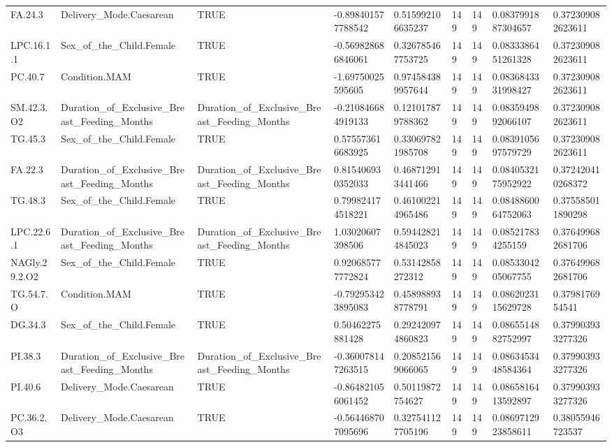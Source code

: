 \begin{longtable}{lllllllll}
FA.24.3 & Delivery\_Mode.Caesarean & TRUE & -0.898401577788542 & 0.515992106635237 & 149 & 149 & 0.0837991887304657 & 0.372309082623611 \\
LPC.16.1.1 & Sex\_of\_the\_Child.Female & TRUE & -0.569828686846061 & 0.326785467753725 & 149 & 149 & 0.0833386451261328 & 0.372309082623611 \\
PC.40.7 & Condition.MAM & TRUE & -1.69750025595605 & 0.974584389957644 & 149 & 149 & 0.0836843331998427 & 0.372309082623611 \\
SM.42.3.O2 & Duration\_of\_Exclusive\_Breast\_Feeding\_Months & Duration\_of\_Exclusive\_Breast\_Feeding\_Months & -0.210846684919133 & 0.121017879788362 & 149 & 149 & 0.0835949892066107 & 0.372309082623611 \\
TG.45.3 & Sex\_of\_the\_Child.Female & TRUE & 0.575573616683925 & 0.330697821985708 & 149 & 149 & 0.0839105697579729 & 0.372309082623611 \\
FA.22.3 & Duration\_of\_Exclusive\_Breast\_Feeding\_Months & Duration\_of\_Exclusive\_Breast\_Feeding\_Months & 0.815406930352033 & 0.468712913441466 & 149 & 149 & 0.0840532175952922 & 0.372420410268372 \\
TG.48.3 & Sex\_of\_the\_Child.Female & TRUE & 0.799824174518221 & 0.461002214965486 & 149 & 149 & 0.0848860064752063 & 0.375585011890298 \\
LPC.22.6.1 & Duration\_of\_Exclusive\_Breast\_Feeding\_Months & Duration\_of\_Exclusive\_Breast\_Feeding\_Months & 1.03020607398506 & 0.594428214845023 & 149 & 149 & 0.085217834255159 & 0.376499682681706 \\
NAGly.29.2.O2 & Sex\_of\_the\_Child.Female & TRUE & 0.920685777772824 & 0.53142858272312 & 149 & 149 & 0.0853304205067755 & 0.376499682681706 \\
TG.54.7.O & Condition.MAM & TRUE & -0.792953423895083 & 0.458988938778791 & 149 & 149 & 0.0862023115629728 & 0.3798176954541 \\
DG.34.3 & Sex\_of\_the\_Child.Female & TRUE & 0.50462275881428 & 0.292420974860823 & 149 & 149 & 0.0865514882752997 & 0.379903933277326 \\
PI.38.3 & Duration\_of\_Exclusive\_Breast\_Feeding\_Months & Duration\_of\_Exclusive\_Breast\_Feeding\_Months & -0.360078147263515 & 0.208521569066065 & 149 & 149 & 0.0863453448584364 & 0.379903933277326 \\
PI.40.6 & Delivery\_Mode.Caesarean & TRUE & -0.864821056061452 & 0.50119872754627 & 149 & 149 & 0.0865816413592897 & 0.379903933277326 \\
PC.36.2.O3 & Delivery\_Mode.Caesarean & TRUE & -0.564468707095696 & 0.327541127705196 & 149 & 149 & 0.0869712923858611 & 0.38055946723537 \\

\end{longtable}
